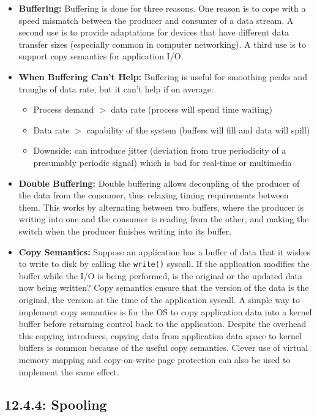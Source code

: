 \documentclass[12pt]{article}
\begin{document}
\begin{itemize}
    \item \textbf{Buffering:} Buffering is done for three reasons. One reason is to cope with a speed mismatch between the producer and consumer of a data stream. A second use is to provide adaptations for devices that have different data transfer sizes (especially common in computer networking). A third use is to support copy semantics for application I/O.
    \item \textbf{When Buffering Can't Help:} Buffering is useful for smoothing peaks and troughs of data rate, but it can't help if on average:
        \begin{itemize}
            \item Process demand \(>\) data rate (process will spend time waiting)
            \item Data rate \(>\) capability of the system (buffers will fill and data will spill)
            \item Downside: can introduce jitter (deviation from true periodicity of a presumably periodic signal) which is bad for real-time or multimedia
        \end{itemize}
    \item \textbf{Double Buffering:} Double buffering allows decoupling of the producer of the data from the consumer, thus relaxing timing requirements between them. This works by alternating between two buffers, where the producer is writing into one and the consumer is reading from the other, and making the switch when the producer finishes writing into its buffer.
    \item \textbf{Copy Semantics:} Suppose an application has a buffer of data that it wishes to write to disk by calling the \texttt{write()} syscall. If the application modifies the buffer while the I/O is being performed, is the original or the updated data now being written? Copy semantics ensure that the version of the data is the original, the version at the time of the application syscall. A simple way to implement copy semantics is for the OS to copy application data into a kernel buffer before returning control back to the application. Despite the overhead this copying introduces, copying data from application data space to kernel buffers is common because of the useful copy semantics. Clever use of virtual memory mapping and copy-on-write page protection can also be used to implement the same effect.
\end{itemize}

\subsection*{12.4.4: Spooling}
\end{document}

